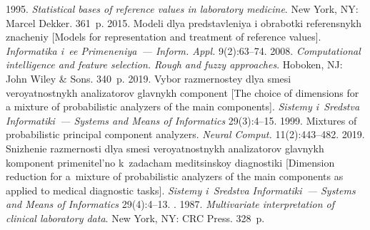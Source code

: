 


  



  \begin{multicols}{2}

\renewcommand{\bibname}{\protect\rmfamily References}

{\small\frenchspacing
 {%
 \begin{thebibliography}{9}
 1995. \textit{Statistical bases of reference 
values in laboratory medicine}. New York, NY: Marcel Dekker. 361~p.
 2015. Modeli dlya predstavleniya i obrabotki referensnykh 
znacheniy [Models for representation and treatment of reference values]. 
\textit{Informatika i~ee Primeneniya~--- Inform. Appl.} 9(2):63--74.
 2008. \textit{Computational intelligence and feature 
selection. Rough and fuzzy approaches}. Hoboken, NJ: John Wiley \& Sons. 340~p.
 2019. Vybor razmernostey dlya smesi veroyatnostnykh 
analizatorov glavnykh component [The choice of dimensions for a mixture of 
probabilistic analyzers of the main components]. \textit{Sistemy i~Sredstva 
Informatiki~--- Systems and Means of Informatics} 29(3):4--15.
 1999. Mixtures of probabilistic principal 
component analyzers. \textit{Neural Comput.} 11(2):443--482.
 2019. Snizhenie razmernosti dlya smesi veroyatnostnykh 
analizatorov glavnykh komponent primenitel'no k~zadacham meditsinskoy 
diagnostiki [Dimension reduction for a~mixture of probabilistic analyzers of the main 
components as applied to medical diagnostic tasks]. \textit{Sistemy i~Sredstva 
Informatiki~--- Systems and Means of Informatics} 29(4):4--13.
. 1987. \textit{Multivariate interpretation of 
clinical laboratory data}. New York, NY: CRC Press. 328~p.
\end{thebibliography}

 }
 }

\end{multicols}

